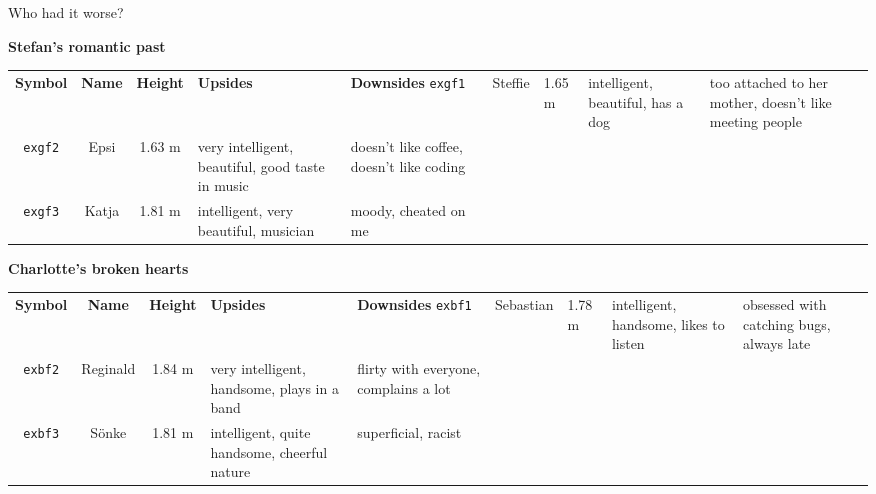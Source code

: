 \begin{frame}{Who had it worse?}
%
\begin{center}
\scriptsize
\textbf{Stefan's romantic past}
\begin{tabular}{c|ccp{.3\linewidth}p{.3\linewidth}}
	\textbf{Symbol} & \textbf{Name} & \textbf{Height} & \textbf{Upsides}                                 & \textbf{Downsides} \tabcrlf
	\texttt{exgf1}  & Steffie       & 1.65 m          & intelligent, beautiful, has a dog                & too attached to her mother, 
																																																				doesn't like meeting people \\
	\texttt{exgf2}  & Epsi          & 1.63 m          & very intelligent, beautiful, good taste in music & doesn't like coffee, doesn't like coding \\
	\texttt{exgf3}  & Katja         & 1.81 m          & intelligent, very beautiful, musician            & moody, cheated on me
\end{tabular}
\end{center}

\begin{center}
\scriptsize
\textbf{Charlotte's broken hearts}
\begin{tabular}{c|ccp{.3\linewidth}p{.3\linewidth}}
	\textbf{Symbol} & \textbf{Name} & \textbf{Height} & \textbf{Upsides}                                 & \textbf{Downsides} \tabcrlf
	\texttt{exbf1}  & Sebastian     & 1.78 m          & intelligent, handsome, likes to listen           & obsessed with catching bugs, always late \\
	\texttt{exbf2}  & Reginald      & 1.84 m          & very intelligent, handsome, plays in a band      & flirty with everyone, complains a lot \\
	\texttt{exbf3}  & Sönke         & 1.81 m          & intelligent, quite handsome, cheerful nature     & superficial, racist
\end{tabular}
\end{center}
%
\end{frame}


